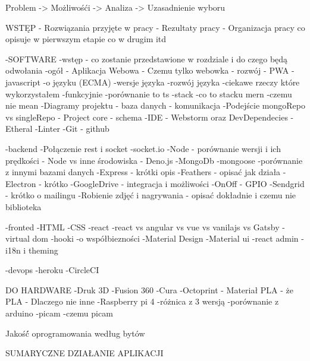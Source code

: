 Problem -> Możliwośći -> Analiza -> Uzasadnienie wyboru
        
WSTĘP
- Rozwiązania przyjęte w pracy
- Rezultaty pracy
- Organizacja pracy
co opisuje w pierwszym etapie co w drugim itd
        
-SOFTWARE
-wstęp - co zostanie przedstawione w rozdziale i do czego będą odwołania
-ogół
    - Aplikacja Webowa
        - Czemu tylko webowka
        - rozwój
        - PWA
    -javascript
        -o języku (ECMA)
        -wersje języka
        -rozwój języka
        -ciekawe rzeczy które wykorzystałem
        -funkcyjnie
        -porównanie to ts
    -stack
        -co to stacku mern
        -czemu nie mean
    -Diagramy projektu
        - baza danych
        - komunikacja
    -Podejście mongoRepo vs singleRepo
    - Project core - schema
    -IDE - Webstorm oraz DevDependecies
        -Etheral
        -Linter
    -Git - github

-backend
    -Połączenie rest i socket
        -socket.io
    -Node
        - porównanie wersji i ich prędkości
        - Node vs inne środowiska
        - Deno.js
     -MongoDb
        -mongoose
        -porównanie z innymi bazami danych
    -Express - krótki opis
    -Feathers
        - opisać jak działa
    -Electron - krótko
    -GoogleDrive - integracja i możliwości
    -OnOff - GPIO
    -Sendgrid - krótko o mailingu
    -Robienie zdjęć i nagrywania - opisać dokładnie i czemu nie biblioteka
 
 
    

-fronted
    -HTML
    -CSS
    -react
        -react vs angular vs vue vs vanilajs vs Gatsby
        -virtual dom
        -hooki
        -o współbiezności
    -Material Design
    -Material ui
    -react admin
    -i18n i theming

-devops
    -heroku
    -CircleCI





DO HARDWARE
-Druk 3D
    -Fusion 360
    -Cura
    -Octoprint
    - Materiał PLA
        - że PLA
        - Dlaczego nie inne
-Raspberry pi 4
    -różnica z 3 wersją
    -porównanie z arduino
-picam
    -czemu picam
    
Jakość́ oprogramowania
według bytów
    
SUMARYCZNE DZIAŁANIE APLIKACJI

